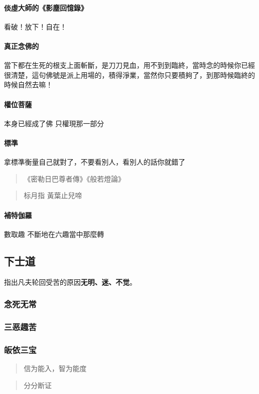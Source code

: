 \paragraph{倓虛大師的《影塵回憶錄》}看破！放下！自在！

\paragraph{真正念佛的}
當下都在生死的根支上面斬斷，是刀刀見血，用不到到臨終，當時念的時候你已經很清楚，這句佛號是派上用場的，積得淨業，當然你只要積夠了，到那時候臨終的時候自然去嘛！
\paragraph{權位菩薩} 本身已經成了佛 只權現那一部分
\paragraph{標準}拿標準衡量自己就對了，不要看別人，看別人的話你就錯了

\begin{quote}
  《密勒日巴尊者傳》《般若燈論》
\end{quote}
\begin{quote}
  标月指 黃葉止兒啼
\end{quote}

\paragraph{補特伽羅}
數取趣 不斷地在六趣當中那麼轉


\subsection{下士道}
指出凡夫轮回受苦的原因\textbf{无明、迷、不觉}。

\subsubsection{念死无常}
\subsubsection{三恶趣苦}
\subsubsection{皈依三宝}
\begin{quote}
  信为能入，智为能度
\end{quote}
\begin{quote}
  分分断证
\end{quote}
